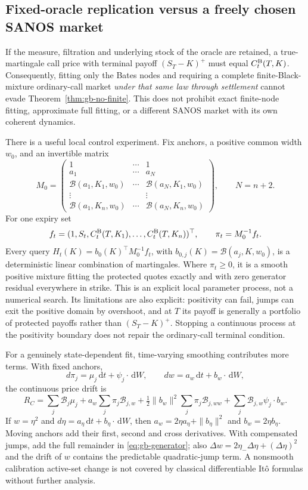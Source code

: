 \documentclass[11pt,a4paper]{article}
\numberwithin{equation}{section}
\theoremstyle{definition}\newtheorem{definition}[theorem]{Definition}
\theoremstyle{remark}\newtheorem{remark}[theorem]{Remark}
\newcommand{\dd}{\,\mathrm d}\newcommand{\dt}{\,\mathrm dt}
\newcommand{\Black}{\mathcal B}\newcommand{\LC}{\mathcal L}
\begin{document}
\subsection{Fixed-oracle replication versus a freely chosen SANOS market}
\label{sec:bates-local}
If the measure, filtration and underlying stock of the oracle are retained, a true-martingale call price with terminal payoff $(S_T-K)^+$ must equal $C_t^{\rm B}(T,K)$. Consequently, fitting only the Bates nodes and requiring a complete finite-Black-mixture ordinary-call market \emph{under that same law through settlement} cannot evade Theorem~\ref{thm:gb-no-finite}. This does not prohibit exact finite-node fitting, approximate full fitting, or a different SANOS market with its own coherent dynamics.

There is a useful local control experiment. Fix anchors, a positive common width $w_0$, and an invertible matrix
\[
 M_0=\begin{pmatrix}
 1&\cdots&1\\ a_1&\cdots&a_N\\
 \Black(a_1,K_1,w_0)&\cdots&\Black(a_N,K_1,w_0)\\
 \vdots&&\vdots\\
 \Black(a_1,K_n,w_0)&\cdots&\Black(a_N,K_n,w_0)
 \end{pmatrix},\qquad N=n+2.
\]
For one expiry set
\begin{equation}
 f_t=(1,S_t,C_t^{\rm B}(T,K_1),\ldots,C_t^{\rm B}(T,K_n))^\top,
 \qquad \pi_t=M_0^{-1}f_t.
 \label{eq:gb-local-control}
\end{equation}
Every query $H_t(K)=b_0(K)^\top M_0^{-1}f_t$, with $b_{0,j}(K)=\Black(a_j,K,w_0)$, is a deterministic linear combination of martingales. Where $\pi_t\geq0$, it is a smooth positive mixture fitting the protected quotes exactly and with zero generator residual everywhere in strike. This is an explicit local parameter process, not a numerical search. Its limitations are also explicit: positivity can fail, jumps can exit the positive domain by overshoot, and at $T$ its payoff is generally a portfolio of protected payoffs rather than $(S_T-K)^+$. Stopping a continuous process at the positivity boundary does not repair the ordinary-call terminal condition.

For a genuinely state-dependent fit, time-varying smoothing contributes more terms. With fixed anchors,
\[
 d\pi_j=\mu_j\dt+\psi_j\cdot\dd W,
 \qquad dw=a_w\dt+b_w\cdot\dd W,
\]
the continuous price drift is
\begin{equation}
 R_C=\sum_j\Black_j\mu_j
 +a_w\sum_j\pi_j\Black_{j,w}
 +\tfrac12\|b_w\|^2\sum_j\pi_j\Black_{j,ww}
 +\sum_j\Black_{j,w}\psi_j\cdot b_w.
 \label{eq:gb-eta-drift}
\end{equation}
If $w=\eta^2$ and $d\eta=a_\eta\dt+b_\eta\cdot\dd W$, then $a_w=2\eta a_\eta+\|b_\eta\|^2$ and $b_w=2\eta b_\eta$. Moving anchors add their first, second and cross derivatives. With compensated jumps, add the full remainder in \eqref{eq:gb-generator}; also $\Delta w=2\eta_-\Delta\eta+(\Delta\eta)^2$ and the drift of $w$ contains the predictable quadratic-jump term. A nonsmooth calibration active-set change is not covered by classical differentiable It\^o formulas without further analysis.
\end{document}
